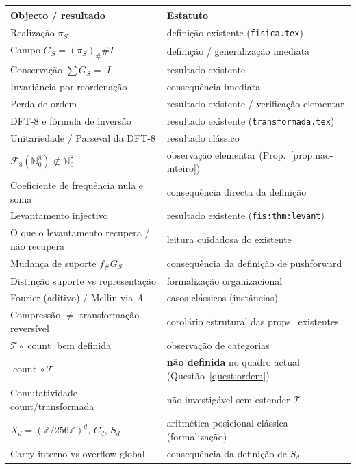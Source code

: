 \documentclass[11pt,a4paper]{article}
\begin{document}
\begin{center}
\small
\begin{tabular}{@{}p{}p{}@{}}
\toprule
\textbf{Objecto / resultado} & \textbf{Estatuto} \\
\midrule
Realização \(\pi_S\) & definição existente (\texttt{fisica.tex}) \\
Campo \(G_S=(\pi_S)_{\#}\#I\) & definição / generalização imediata \\
Conservação \(\sum G_S=\lvert I\rvert\) & resultado existente \\
Invariância por reordenação & consequência imediata \\
Perda de ordem & resultado existente / verificação elementar \\
DFT-8 e fórmula de inversão & resultado existente (\texttt{transformada.tex}) \\
Unitariedade / Parseval da DFT-8 & resultado clássico \\
\(\mathcal F_8(\mathbb N_0^8)\not\subset\mathbb N_0^8\) & observação elementar (Prop.~\ref{prop:nao-inteiro}) \\
Coeficiente de frequência nula e soma & consequência directa da definição \\
Levantamento injectivo & resultado existente (\texttt{fis:thm:levant}) \\
O que o levantamento recupera / não recupera & leitura cuidadosa do existente \\
Mudança de suporte \(f_{\#}G_S\) & consequência da definição de pushforward \\
Distinção suporte vs representação & formalização organizacional \\
Fourier (aditivo) / Mellin via \(\Lambda\) & casos clássicos (instâncias) \\
Compressão \(\neq\) transformação reversível & corolário estrutural das props.\ existentes \\
\(\mathcal T\circ\operatorname{count}\) bem definida & observação de categorias \\
\(\operatorname{count}\circ\mathcal T\) & \textbf{não definida} no quadro actual (Questão~\ref{quest:ordem}) \\
Comutatividade count/transformada & não investigável sem estender \(\mathcal T\) \\
\(X_d=(\mathbb Z/256\mathbb Z)^d\), \(C_d\), \(S_d\) & aritmética posicional clássica (formalização) \\
Carry interno vs overflow global & consequência da definição de \(S_d\) \\

\end{tabular}
\end{center}
\end{document}

